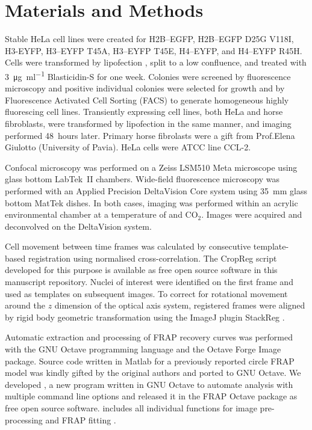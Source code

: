 \section{Materials and Methods}

  Stable HeLa cell lines were created for H2B--EGFP, H2B--EGFP D25G V118I,
  H3-EYFP, H3--EYFP T45A, H3--EYFP T45E, H4--EYFP, and H4--EYFP R45H.
  Cells were transformed by lipofection ,
  split to a low confluence, and treated
  with \SI{3}{\ug\per\ml} \mbox{Blasticidin-S} for one week.
  Colonies were screened by fluorescence microscopy
  and positive individual colonies were selected for growth
  and by Fluorescence Activated Cell Sorting (FACS) to generate
  homogeneous highly fluorescing cell lines.
  Transiently expressing cell lines, both HeLa and horse fibroblasts,
  were transformed by lipofection in
  the same manner, and imaging performed 48~hours later.
  Primary horse fibrolasts were a gift from Prof.\@ Elena Giulotto
  (University of Pavia). HeLa cells were ATCC line CCL-2.

  Confocal microscopy was performed on a Zeiss LSM510 Meta microscope
  using glass bottom LabTek~II chambers.  Wide-field fluorescence
  microscopy was performed with an Applied Precision DeltaVision Core
  system using \SI{35}{\mm} glass bottom MatTek dishes.  In both
  cases, imaging was performed within an acrylic environmental chamber
  at a temperature of  and  CO$_2$.
  Images were acquired and deconvolved on the DeltaVision system.


  Cell movement between time frames was calculated by consecutive
  template-based registration using normalised cross-correlation.
  The CropReg script developed for this purpose is available
  as free open source software in this manuscript repository.
  Nuclei of interest were identified
  on the first frame and used as templates on subsequent images.
  To correct for rotational movement
  around the $z$ dimension of the optical axis system,
  registered frames were aligned by rigid body geometric transformation
  using the ImageJ \citep{imagej1} plugin StackReg \citep{stackreg}.

  Automatic extraction and processing of FRAP recovery curves was
  performed with the GNU Octave programming language \citep{octave}
  and the Octave Forge Image package.  Source code written in Matlab
  for a previously reported circle FRAP model \citep{mcnally-frap-code}
  was kindly gifted by the original authors and ported to GNU Octave.
  We developed , a new program written in GNU Octave
  to automate analysis with multiple command line options
  and released it in the FRAP Octave package as free open source software.
   includes all individual functions for image
  pre-processing and FRAP fitting .
